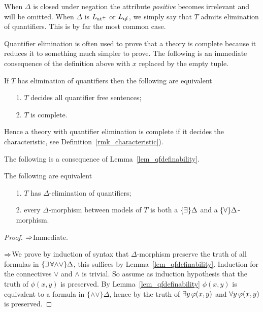 
When $\Delta$ is closed under negation the attribute \textit{positive\/} becomes irrelevant and will be omitted. When $\Delta$ is $L_{\rm at^{\scriptscriptstyle\pm}}$ or $L_{\rm qf}$, we simply say that $T$ admits elimination of quantifiers. This is by far the most common case.

Quantifier elimination is often used to prove that a theory is complete because it reduces it to something much simpler to prove. The following is an immediate consequence of the definition above with $x$ replaced by the empty tuple.

\begin{remark}
If $T$ has elimination of quantifiers then the following are equivalent 
\begin{itemize}
\item[1.] $T$ decides all quantifier free sentences;
\item[2.] $T$ is complete.
\end{itemize}
Hence a theory with quantifier elimination is complete if it decides the characteristic, see Definition~\ref{rmk_characteristic}).\QED
\end{remark}


The following is a consequence of Lemma~\ref{lem_qfdefinability}.

\begin{corollary}\label{corol_QE}
The following are equivalent
\begin{itemize}
\item[1.] $T$ has $\Delta$-elimination of quantifiers;
\item[2.] every $\Delta$-morphism between models of $T$ is both a $\{\exists\}\Delta$ and a $\{\forall\}\Delta$-morphism.
\end{itemize}
\end{corollary}
\begin{proof}
$\Rightarrow$\quad Immediate.

$\Rightarrow$\quad We prove by induction of syntax that $\Delta$-morphism preserve the truth of all formulas in $\{\exists\,\forall\mathord\wedge\mathord\vee\}\Delta$, this suffices by Lemma~\ref{lem_qfdefinability}. Induction for the connectives $\vee$ and $\wedge$ is trivial.  So assume as induction hypothesis that the truth of  $\phi(x,y)$ is preserved.  By Lemma~\ref{lem_qfdefinability} $\phi(x,y)$ is equivalent to a formula in $\{\mathord\wedge\mathord\vee\}\Delta$, hence by  the truth of $\exists y\, \varphi (x,y)$ and $\forall y \,\varphi (x,y)$ is preserved.
\end{proof}

